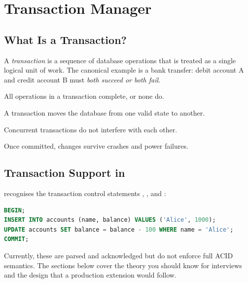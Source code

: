 \chapter{Transaction Manager}
\label{ch:transactions}

\section{What Is a Transaction?}

A \emph{transaction} is a sequence of database operations that is treated as a single logical unit of work.  The canonical example is a bank transfer: debit account A and credit account B must \emph{both succeed or both fail}.

\begin{conceptbox}
\begin{description}[nosep,leftmargin=1.5cm]
  \item[Atomicity] All operations in a transaction complete, or none do.
  \item[Consistency] A transaction moves the database from one valid state to another.
  \item[Isolation] Concurrent transactions do not interfere with each other.
  \item[Durability] Once committed, changes survive crashes and power failures.
\end{description}
\end{conceptbox}

\section{Transaction Support in \shiftdb{}}

\shiftdb{} recognises the transaction control statements , , and :

\begin{lstlisting}[language=SQL, caption={Transaction syntax.}]
BEGIN;
INSERT INTO accounts (name, balance) VALUES ('Alice', 1000);
UPDATE accounts SET balance = balance - 100 WHERE name = 'Alice';
COMMIT;
\end{lstlisting}

Currently, these are parsed and acknowledged but do not enforce full ACID semantics.  The sections below cover the theory you should know for interviews and the design that a production extension would follow.

